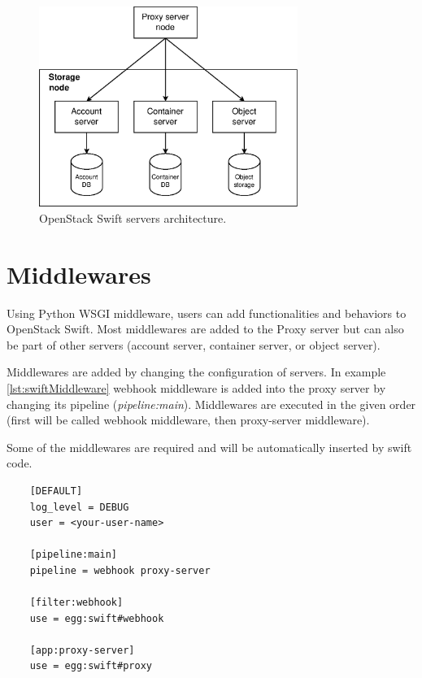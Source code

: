     \begin{figure}[hbt]
        \centering
        \includegraphics[width=0.75\textwidth]{obrazky-figures/swift-servers.eps}
        \caption{OpenStack Swift servers architecture.}
        \label{fig:swiftServers}
    \end{figure}

    \section{Middlewares}
    Using Python WSGI middleware, users can add functionalities and behaviors to OpenStack Swift. Most middlewares are added to the Proxy server but can also be part of other servers (account server, container server, or object server).

    Middlewares are added by changing the configuration of servers. In example \ref{lst:swiftMiddleware}
    webhook middleware is added into the proxy server by changing its pipeline (\textit{pipeline:main}). Middlewares are executed in the given order (first will be called webhook middleware, then proxy-server middleware).

    Some of the middlewares are required and will be automatically inserted by swift code\cite{swiftMiddleware}.

    \lstset{
        caption=Example of proxy server configuration (proxy-server.conf),
        label=lst:swiftMiddleware
    }
    \begin{lstlisting}
    [DEFAULT]
    log_level = DEBUG
    user = <your-user-name>

    [pipeline:main]
    pipeline = webhook proxy-server

    [filter:webhook]
    use = egg:swift#webhook

    [app:proxy-server]
    use = egg:swift#proxy
    \end{lstlisting}

